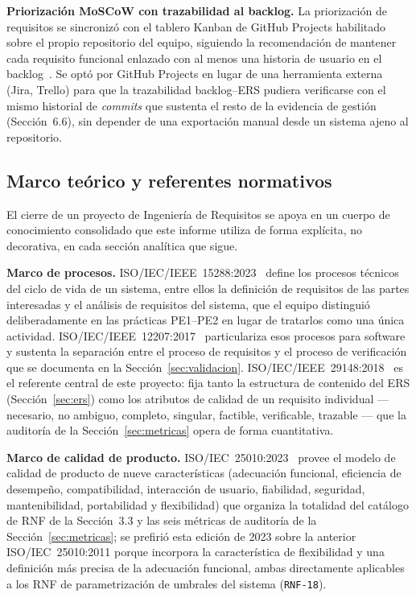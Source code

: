 \documentclass[11pt,a4paper]{article}
\newcommand{\id}[1]{\texttt{#1}}
\begin{document}
\textbf{Priorización MoSCoW con trazabilidad al backlog.} La priorización de requisitos se
sincronizó con el tablero Kanban de GitHub Projects habilitado sobre el propio repositorio del
equipo, siguiendo la recomendación de mantener cada requisito funcional enlazado con al menos una
historia de usuario en el backlog~\cite{hoyxu2023}. Se optó por GitHub Projects en lugar de una
herramienta externa (Jira, Trello) para que la trazabilidad backlog--ERS pudiera verificarse con el
mismo historial de \emph{commits} que sustenta el resto de la evidencia de gestión (Sección~6.6),
sin depender de una exportación manual desde un sistema ajeno al repositorio.

\subsection{Marco teórico y referentes normativos}
\label{sec:marco-teorico}

El cierre de un proyecto de Ingeniería de Requisitos se apoya en un cuerpo de conocimiento
consolidado que este informe utiliza de forma explícita, no decorativa, en cada sección analítica
que sigue.

\textbf{Marco de procesos.} ISO/IEC/IEEE~15288:2023~\cite{iso15288} define los procesos técnicos
del ciclo de vida de un sistema, entre ellos la definición de requisitos de las partes interesadas y
el análisis de requisitos del sistema, que el equipo distinguió deliberadamente en las prácticas
PE1--PE2 en lugar de tratarlos como una única actividad. ISO/IEC/IEEE~12207:2017~\cite{iso12207}
particulariza esos procesos para software y sustenta la separación entre el proceso de requisitos y
el proceso de verificación que se documenta en la Sección~\ref{sec:validacion}.
ISO/IEC/IEEE~29148:2018~\cite{iso29148} es el referente central de este proyecto: fija tanto la
estructura de contenido del ERS (Sección~\ref{sec:ers}) como los atributos de calidad de un
requisito individual --- necesario, no ambiguo, completo, singular, factible, verificable,
trazable --- que la auditoría de la Sección~\ref{sec:metricas} opera de forma cuantitativa.

\textbf{Marco de calidad de producto.} ISO/IEC~25010:2023~\cite{iso25010} provee el modelo de
calidad de producto de nueve características (adecuación funcional, eficiencia de desempeño,
compatibilidad, interacción de usuario, fiabilidad, seguridad, mantenibilidad, portabilidad y
flexibilidad) que organiza la totalidad del catálogo de RNF de la Sección~3.3 y las seis métricas de
auditoría de la Sección~\ref{sec:metricas}; se prefirió esta edición de 2023 sobre la anterior
ISO/IEC~25010:2011 porque incorpora la característica de flexibilidad y una definición más precisa
de la adecuación funcional, ambas directamente aplicables a los RNF de parametrización de umbrales
del sistema (\id{RNF-18}).
\end{document}
